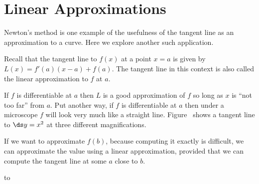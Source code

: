 \section{Linear Approximations}{}{}
\nobreak
Newton's method is one example of the usefulness of the tangent line
as an approximation to a curve. Here we explore another such
application.

Recall that the tangent line to $f(x)$ at a point $x=a$ is given by
$L(x) = f'(a) (x-a) + f(a)$.  The tangent line in this context is also
called the {\dfont linear approximation\/}
to $f$ at $a$.

If $f$ is differentiable at $a$ then $L$ is a good approximation of
$f$ so long as $x$ is ``not too far'' from $a$.  Put another way, if
$f$ is differentiable at $a$ then under a microscope $f$ will look
very much like a straight line. Figure~ shows a tangent line to $\ds y=x^2$ at three different
magnifications. 

If we want to approximate $f(b)$,
because computing it exactly is difficult, we can approximate the
value using a linear approximation, provided that we can compute the
tangent line at some $a$ close to $b$.

\figure
\hbox to 

